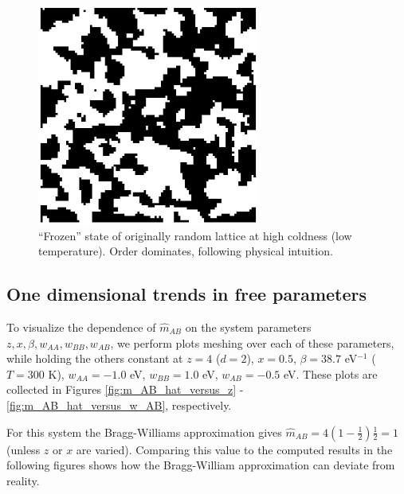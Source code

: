 \documentclass[10pt]{article}
\begin{document}
\begin{figure}[h!]
\centering
\includegraphics[width=0.65\textwidth]{Figures/verification_frozen_lattice.png}
\caption{``Frozen'' state of originally random lattice at high coldness (low temperature).
Order dominates, following physical intuition.}
\label{fig:frozen_lattice}
\end{figure}

\subsection{One dimensional trends in free parameters}
To visualize the dependence of $\hat{m}_{AB}$ on the system parameters $z,x,\beta,w_{AA},w_{BB},w_{AB}$, we perform plots meshing over each of these parameters, while holding the others constant at $z=4$ ($d = 2$), $x = 0.5$, $\beta = 38.7$ eV$^{-1}$ ($T = 300$ K), $w_{AA} = -1.0$ eV, $w_{BB} = 1.0$ eV, $w_{AB} = -0.5$ eV.
These plots are collected in Figures \ref{fig:m_AB_hat_versus_z} - \ref{fig:m_AB_hat_versus_w_AB}, respectively.

For this system the Bragg-Williams approximation gives $\hat{m}_{AB} = 4 \left(1-\frac{1}{2}\right) \frac{1}{2} = 1$ (unless $z$ or $x$ are varied).
Comparing this value to the computed results in the following figures shows how the Bragg-William approximation can deviate from reality.
\end{document}
